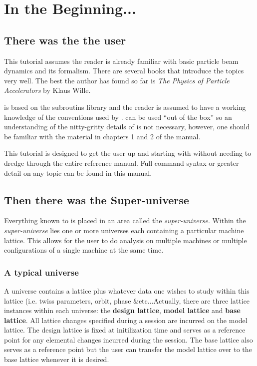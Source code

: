 \documentclass{report}
\begin{document}
\chapter{In the Beginning...}
\label{c:beginning}

\section{There was the the user}

This tutorial assumes the reader is already familiar with basic particle beam
dynamics and its formalism. There are several books that introduce the topics
very well. The best the author has found so far is \textit{The Physics of
Particle Accelerators} by Klaus Wille. 

\tao is based on the \bmad subroutins library and the reader is assumed to have
a working knowledge of the conventions used by \bmad. \tao can be used ``out of
the box'' so an understanding of the nitty-gritty details of \bmad is not
necessary, however, one should be familiar with the material in chapters 1 and 2
of the \bmad manual.


This tutorial is designed to get the user up and starting with \tao without
needing to dredge through the entire reference manual. Full command syntax
or greater detail on any topic can be found in this manual.

\section{Then there was the Super-universe}

Everything known to \tao is placed in an area called the
\textit{super-universe}. Within the \textit{super-universe} lies one or more
universes each containing a particular machine lattice. This allows for the user
to do analysis on multiple machines or multiple configurations of a single
machine at the same time. 

\subsection{A typical universe}
A universe contains a \bmad lattice plus whatever data one wishes to study
within this lattice (i.e. twiss parameters, orbit, phase \&etc...\. Actually,
there are three lattice instances within each universe: the \textbf{design
lattice}, \textbf{model lattice} and \textbf{base lattice}. All lattice changes
specified during a session are incurred on the model lattice. The design lattice is
fixed at initilization time and serves as a reference point for any elemental
changes incurred during the \tao session. The base lattice also serves as a
reference point but the user can transfer the model lattice over to the base
lattice whenever it is desired.
\end{document}
